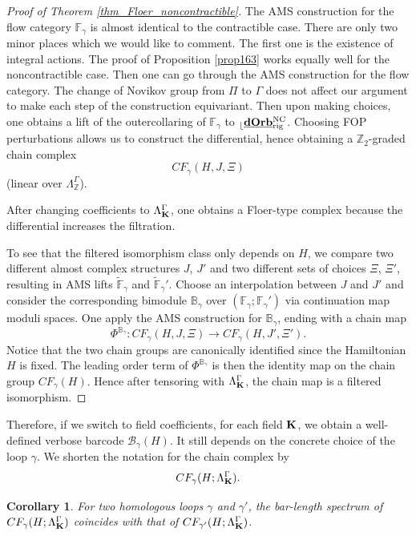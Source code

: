 \documentclass[reqno, 10pt]{amsart}
\numberwithin{equation}{section}
\numberwithin{equation}{section}
\newtheorem{cor}[thm]{Corollary}
\theoremstyle{definition}
\theoremstyle{remark}
\newcommand{\beqn}{\begin{equation*}}
\newcommand{\eeqn}{\end{equation*}}
\newcommand{\mb}{\mathbb}
\newcommand{\mc}{\mathcal}
\renewcommand{\outer}{{}_{\lfloor}}
\newcommand{\uds}[1]{\underline{\smash{#1}}}
\begin{document}
\begin{proof}[Proof of Theorem \ref{thm_Floer_noncontractible}]
The AMS construction for the flow category ${\mb F}_\gamma$ is almost identical to the contractible case. There are only two minor places which we would like to comment. The first one is the existence of integral actions. The proof of Proposition \ref{prop163} works equally well for the noncontractible case. Then one can go through the AMS construction for the flow category. The change of Novikov group from $\Pi$ to $\Gamma$ does not affect our argument to make each step of the construction equivariant. Then upon making choices, one obtains a lift of the outercollaring of ${\mb F}_\gamma$ to $\outer \uds{\bf dOrb}_{\rm rig}^{\rm NC}$. Choosing FOP perturbations allows us to construct the differential, hence obtaining a ${\mb Z}_2$-graded chain complex
\beqn
CF_\gamma(H, J, \Xi)
\eeqn
(linear over $\Lambda_{\mb Z}^\Gamma$). 

After changing coefficients to $\Lambda_{\bf K}^\Gamma$, one obtains a Floer-type complex because the differential increases the filtration. 

To see that the filtered isomorphism class only depends on $H$, we compare two different almost complex structures $J$, $J'$ and two different sets of choices $\Xi$, $\Xi'$, resulting in AMS lifts $\tilde {\mb F}_\gamma$ and $\tilde {\mb F}_\gamma'$. Choose an interpolation between $J$ and $J'$ and consider the corresponding bimodule ${\mb B}_\gamma$ over $({\mb F}_\gamma; {\mb F}_\gamma')$ via continuation map moduli spaces. One apply the AMS construction for ${\mb B}_\gamma$, ending with a chain map 
\beqn
\Phi^{{\mb B}_\gamma}: CF_\gamma(H, J, \Xi) \to CF_\gamma(H, J', \Xi').
\eeqn
Notice that the two chain groups are canonically identified since the Hamiltonian $H$ is fixed. The leading order term of $\Phi^{{\mb B}_\gamma}$ is then the identity map on the chain group $CF_\gamma(H)$. Hence after tensoring with $\Lambda_{{\bf K}}^\Gamma$, the chain map is a filtered isomorphism.
\end{proof}

Therefore, if we switch to field coefficients, for each field ${\bf K}$, we obtain a well-defined verbose barcode ${\mc B}_\gamma(H)$. It still depends on the concrete choice of the loop $\gamma$. We shorten the notation for the chain complex by 
\beqn
CF_\gamma(H; \Lambda_{\bf K}^\Gamma).
\eeqn

\begin{cor}
For two homologous loops $\gamma$ and $\gamma'$, the bar-length spectrum of $CF_\gamma(H; \Lambda_{\bf K}^{\Gamma})$ coincides with that of $CF_{\gamma'}(H; \Lambda_{\bf K}^\Gamma)$.
\end{cor}
\end{document}
